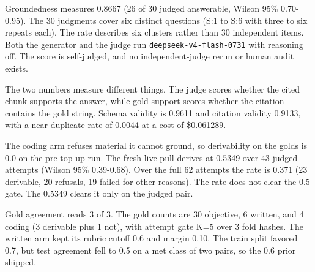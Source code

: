Groundedness measures 0.8667 (26 of 30 judged answerable, Wilson 95\% 0.70-0.95). The 30 judgments cover six distinct questions (S:1 to S:6 with three to six repeats each). The rate describes six clusters rather than 30 independent items. Both the generator and the judge run \texttt{deepseek-v4-flash-0731} with reasoning off. The score is self-judged, and no independent-judge rerun or human audit exists.

The two numbers measure different things. The judge scores whether the cited chunk supports the answer, while gold support scores whether the citation contains the gold string. Schema validity is 0.9611 and citation validity 0.9133, with a near-duplicate rate of 0.0044 at a cost of \$0.061289.

The coding arm refuses material it cannot ground, so derivability on the golds is 0.0 on the pre-top-up run. The fresh live pull derives at 0.5349 over 43 judged attempts (Wilson 95\% 0.39-0.68). Over the full 62 attempts the rate is 0.371 (23 derivable, 20 refusals, 19 failed for other reasons). The rate does not clear the 0.5 gate. The 0.5349 clears it only on the judged pair.

Gold agreement reads 3 of 3. The gold counts are 30 objective, 6 written, and 4 coding (3 derivable plus 1 not), with attempt gate K=5 over 3 fold hashes. The written arm kept its rubric cutoff 0.6 and margin 0.10. The train split favored 0.7, but test agreement fell to 0.5 on a met class of two pairs, so the 0.6 prior shipped.

